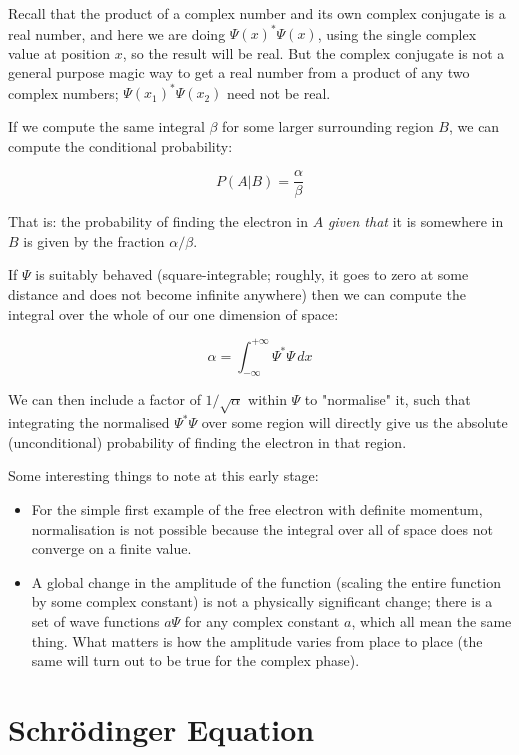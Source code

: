 Recall that the product of a complex number and its own complex conjugate is a real number, and here we are doing $\Psi(x)^*\Psi(x)$, using the single complex value at position $x$, so the result will be real. But the complex conjugate is not a general purpose magic way to get a real number from a product of any two complex numbers; $\Psi(x_1)^*\Psi(x_2)$ need not be real.

If we compute the same integral $\beta$ for some larger surrounding region $B$, we can compute the conditional probability:

$$
P(A|B) = \frac{\alpha}{\beta}
$$

That is: the probability of finding the electron in $A$ \textit{given that} it is somewhere in $B$ is given by the fraction $\alpha / \beta$.

If $\Psi$ is suitably behaved (square-integrable; roughly, it goes to zero at some distance and does not become infinite anywhere) then we can compute the integral over the whole of our one dimension of space:

$$
\alpha =
\int_{-\infty}^{+\infty}
\Psi^*\Psi
\,dx
$$

We can then include a factor of $1/\sqrt{\alpha}$ within $\Psi$ to "normalise" it, such that integrating the normalised $\Psi^*\Psi$ over some region will directly give us the absolute (unconditional) probability of finding the electron in that region.

Some interesting things to note at this early stage:

\begin{itemize}
  \item For the simple first example of the free electron with definite momentum, normalisation is not possible because the integral over all of space does not converge on a finite value.
  \item A global change in the amplitude of the function (scaling the entire function by some complex constant) is not a physically significant change; there is a set of wave functions $a\Psi$ for any complex constant $a$, which all mean the same thing. What matters is how the amplitude varies from place to place (the same will turn out to be true for the complex phase).
\end{itemize}

\section{Schrödinger Equation}

